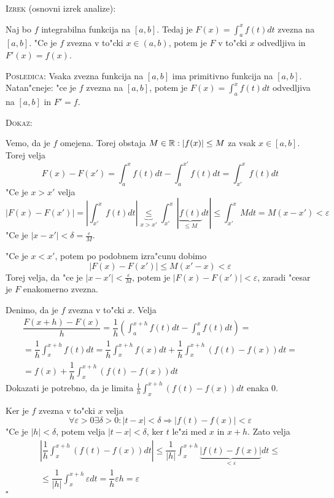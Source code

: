 %
\textsc{Izrek} (osnovni izrek analize):

Naj bo $f$ integrabilna funkcija na $[a, b]$. Tedaj je $F(x) = \int_a^x f(t) dt$ zvezna na $[a, b]$. "Ce je $f$ zvezna v to"cki $x \in (a, b)$, potem je $F$ v to"cki $x$ odvedljiva in $F'(x) = f(x)$.

\textsc{Posledica:} Vsaka zvezna funkcija na $[a, b]$ ima primitivno funkcija na $[a, b]$. Natan"cneje: "ce je $f$ zvezna na $[a, b]$, potem je $F(x) = \int_a^x f(t) dt$ odvedljiva na $[a, b]$ in $F' = f$.

\textsc{Dokaz:} 

Vemo, da je $f$ omejena. Torej obstaja $M \in \mathbb{R}: |f(x)| \leq M$ za vsak $x \in [a, b]$. Torej velja
\begin{equation*}
F(x) - F(x') = \int_a^x f(t) dt - \int_a^{x'} f(t) dt = \int_{x'}^{x} f(t) dt
\end{equation*}
"Ce je $x > x'$ velja
\begin{equation*}
|F(x) - F(x')| = \left| \int_{x'}^{x} f(t) dt \right| \underbrace{\leq}_{x > x'} \int_{x'}^x |\underbrace{f(t)}_{\leq M} dt| \leq \int_{x'}^{x} M dt = M (x - x') < \varepsilon
\end{equation*}
"Ce je $|x - x'| < \delta = \frac{\varepsilon}{M}$.

"Ce je $x < x'$, potem po podobnem izra"cunu dobimo
\begin{equation*}
|F(x) - F(x')| \leq M(x' - x) < \varepsilon
\end{equation*}
Torej velja, da "ce je $|x - x'| < \frac{\varepsilon}{M}$, potem je $|F(x) - F(x')| < \varepsilon$, zaradi "cesar je $F$ enakomerno zvezna.

Denimo, da je $f$ zvezna v to"cki $x$. Velja
\begin{multline*}
\dfrac{F(x + h) - F(x)}{h} = \dfrac{1}{h} \left( \int_{a}^{x+h} f(t) dt - \int_{a}^{x} f(t) dt \right) = \\
= \dfrac{1}{h} \int_{x}^{x + h} f(t) dt = \dfrac{1}{h} \int_{x}^{x+h} f(x) dt + \dfrac{1}{h} \int_{x}^{x+h} (f(t) - f(x)) dt = \\
= f(x) + \dfrac{1}{h} \int_{x}^{x + h} (f(t) - f(x)) dt
\end{multline*}
Dokazati je potrebno, da je limita $\frac{1}{h} \int_{x}^{x + h} (f(t) - f(x)) dt$ enaka 0.

Ker je $f$ zvezna v to"cki $x$ velja
\begin{equation*}
\forall \varepsilon > 0 \exists \delta > 0: |t - x| < \delta \Rightarrow |f(t) - f(x)| < \varepsilon
\end{equation*}
"Ce je $|h| < \delta$, potem velja $|t - x| < \delta$, ker $t$ le"zi med $x$ in $x + h$. Zato velja
\begin{multline*}
\left| \dfrac{1}{h} \int_{x}^{x+h} (f(t) - f(x)) dt \right| \leq \dfrac{1}{|h|} \int_{x}^{x+h} \underbrace{|f(t) - f(x)|}_{< \varepsilon} dt \leq \\
\leq \dfrac{1}{|h|} \int_{x}^{x+h} \varepsilon dt = \dfrac{1}{h} \varepsilon h = \varepsilon
\end{multline*}
\hfill $\square$

